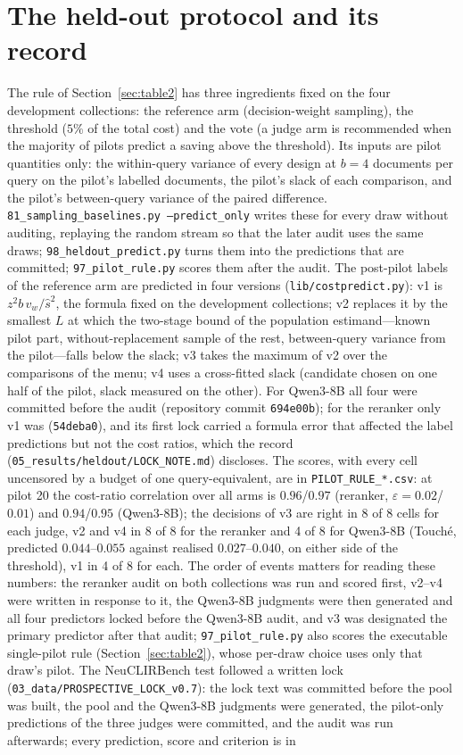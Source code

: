 \documentclass{article}
\newcommand{\eps}{\varepsilon}
\begin{document}
\section{The held-out protocol and its record}\label{app:heldout}
The rule of Section~\ref{sec:table2} has three ingredients fixed on the four development collections: the reference arm (decision-weight sampling), the threshold ($5\%$ of the total cost) and the vote (a judge arm is recommended when the majority of pilots predict a saving above the threshold). Its inputs are pilot quantities only: the within-query variance of every design at $b=4$ documents per query on the pilot's labelled documents, the pilot's slack of each comparison, and the pilot's between-query variance of the paired difference. \texttt{81\_sampling\_baselines.py --predict\_only} writes these for every draw without auditing, replaying the random stream so that the later audit uses the same draws; \texttt{98\_heldout\_predict.py} turns them into the predictions that are committed; \texttt{97\_pilot\_rule.py} scores them after the audit. The post-pilot labels of the reference arm are predicted in four versions (\texttt{lib/costpredict.py}): v1 is $z^2 b\,v_w/\hat s^2$, the formula fixed on the development collections; v2 replaces it by the smallest $L$ at which the two-stage bound of the population estimand---known pilot part, without-replacement sample of the rest, between-query variance from the pilot---falls below the slack; v3 takes the maximum of v2 over the comparisons of the menu; v4 uses a cross-fitted slack (candidate chosen on one half of the pilot, slack measured on the other). For Qwen3-8B all four were committed before the audit (repository commit \texttt{694e00b}); for the reranker only v1 was (\texttt{54deba0}), and its first lock carried a formula error that affected the label predictions but not the cost ratios, which the record (\texttt{05\_results/heldout/LOCK\_NOTE.md}) discloses. The scores, with every cell uncensored by a budget of one query-equivalent, are in \texttt{PILOT\_RULE\_*.csv}: at pilot 20 the cost-ratio correlation over all arms is $0.96$/$0.97$ (reranker, $\eps=0.02$/$0.01$) and $0.94$/$0.95$ (Qwen3-8B); the decisions of v3 are right in 8 of 8 cells for each judge, v2 and v4 in 8 of 8 for the reranker and 4 of 8 for Qwen3-8B (Touch\'e, predicted $0.044$--$0.055$ against realised $0.027$--$0.040$, on either side of the threshold), v1 in 4 of 8 for each. The order of events matters for reading these numbers: the reranker audit on both collections was run and scored first, v2--v4 were written in response to it, the Qwen3-8B judgments were then generated and all four predictors locked before the Qwen3-8B audit, and v3 was designated the primary predictor after that audit; \texttt{97\_pilot\_rule.py} also scores the executable single-pilot rule (Section~\ref{sec:table2}), whose per-draw choice uses only that draw's pilot. The NeuCLIRBench test followed a written lock (\texttt{03\_data/PROSPECTIVE\_LOCK\_v0.7}): the lock text was committed before the pool was built, the pool and the Qwen3-8B judgments were generated, the pilot-only predictions of the three judges were committed, and the audit was run afterwards; every prediction, score and criterion is in 
\end{document}
